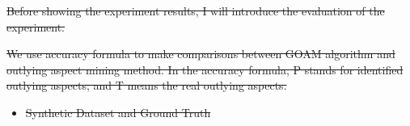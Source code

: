 \documentclass[
 size=14pt,
 paper=smartboard,  %
 mode=present, 		%
 display=slides, 	%
 style=tuliplab,  	%
 pauseslide,
 fleqn,leqno]{powerdot}
\providecommand{\DIFdeltex}[1]{{\protect\color{red}\sout{#1}}}                      %
\providecommand{\DIFdelbegin}{} %
\providecommand{\DIFdelend}{} %
\providecommand{\DIFdel}[1]{\texorpdfstring{\DIFdeltex{#1}}{}} %
\newcommand{\DIFscaledelfig}{0.5}
\newlength{\DIFdelgraphicswidth} %
\newlength{\DIFdelgraphicsheight} %
\newcommand{\DIFdelincludegraphics}[2][]{%
\sbox{\DIFdelgraphicsbox}{\DIFOincludegraphics[#1]{#2}}%
\settoboxwidth{\DIFdelgraphicswidth}{\DIFdelgraphicsbox} %
\settoboxtotalheight{\DIFdelgraphicsheight}{\DIFdelgraphicsbox} %
\scalebox{\DIFscaledelfig}{%
\parbox[b]{\DIFdelgraphicswidth}{\usebox{\DIFdelgraphicsbox}\\[-\baselineskip] \rule{\DIFdelgraphicswidth}{0em}}\llap{\resizebox{\DIFdelgraphicswidth}{\DIFdelgraphicsheight}{%
\setlength{\unitlength}{\DIFdelgraphicswidth}%
\begin{picture}(1,1)%
\thicklines\linethickness{2pt} %
{\color[rgb]{1,0,0}\put(0,0){\framebox(1,1){}}}%
{\color[rgb]{1,0,0}\put(0,0){\line( 1,1){1}}}%
{\color[rgb]{1,0,0}\put(0,1){\line(1,-1){1}}}%
\end{picture}%
}\hspace*{3pt}}} %
} %
\DeclareRobustCommand{\DIFdelbegin}{\DIFOdelbegin \let\includegraphics\DIFdelincludegraphics} %
\DeclareRobustCommand{\DIFdelend}{\DIFOaddend \let\includegraphics\DIFOincludegraphics} %
\begin{document}
\DIFdelbegin %
\DIFdel{Before showing the experiment results,
I will introduce the evaluation of the experiment.
}\DIFdelend %

\DIFdelbegin \DIFdel{We use accuracy formula to make comparisons between GOAM algorithm
and outlying aspect mining method.
In the accuracy formula,
P stands for identified outlying aspects;
and T means the real outlying aspects.
}%
\DIFdelend %

\DIFdelbegin %
\DIFdelend %


\DIFdelbegin %
\DIFdelend %

\DIFdelbegin %
\begin{itemize}%
\item%
\DIFdel{Synthetic Dataset and Ground Truth
}
\end{itemize}%
\DIFdelend %
\end{document}
